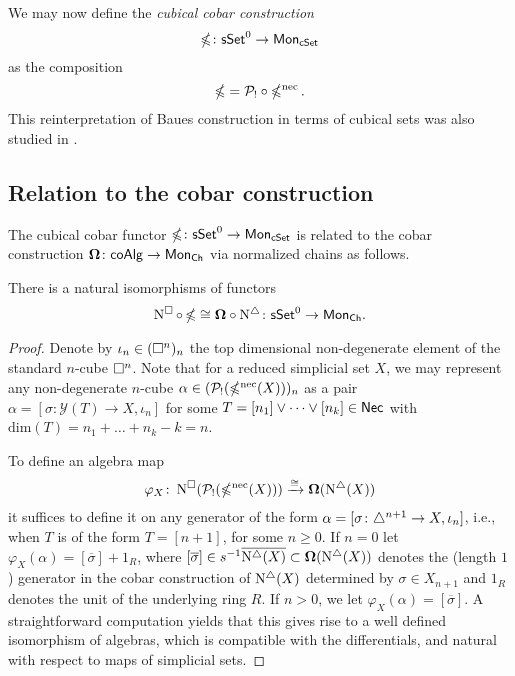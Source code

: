 We may now define the \textit{cubical cobar construction}
$$\operatorname{\mathbb{\Omega}} \colon \mathsf{sSet}^0 \to \mathsf{Mon}_{\mathsf{cSet}}$$ as the composition $$\operatorname{\mathbb{\Omega}}= \mathcal{P}_! \circ \operatorname{\mathbb{\Omega}^{\mathrm{nec}}}.$$ This reinterpretation of Baues construction in terms of cubical sets was also studied in \cite{rivera2018cubical}.

\subsection{Relation to the cobar construction}

The cubical cobar functor $\operatorname{\mathbb{\Omega}}\colon \mathsf{sSet}^0 \to \mathsf{Mon}_{\mathsf{cSet}}$ is related to the cobar construction $\mathbf{\Omega}\colon \mathsf{coAlg} \to \mathsf{Mon}_{\mathsf{Ch}}$ via normalized chains as follows.

\begin{proposition} \label{p:ccobar and cobar}
	There is a natural isomorphisms of functors 
	\begin{equation*}
	\operatorname{N^{\square}} \circ \operatorname{\mathbb{\Omega}} \cong \mathbf{\Omega} \circ \operatorname{N^{\triangle}} \colon \mathsf{sSet}^0 \to \mathsf{Mon}_{\mathsf{Ch}}.
	\end{equation*}
\end{proposition}

\begin{proof} 
	Denote by $\iota_n \in (\square^n)_n$ the top dimensional non-degenerate element of the standard $n$-cube $\square^n$.
	Note that for a reduced simplicial set $X$, we may represent any non-degenerate $n$-cube $\alpha \in (\mathcal{P}_!(\operatorname{\mathbb{\Omega}^{\mathrm{nec}}}(X)))_n$ as a pair $\alpha = [\sigma \colon \mathcal{Y}(T) \to X, \iota_n]$ for some $T = [n_1] \vee \dots \vee [n_k] \in \mathsf{Nec}$ with $\text{dim}(T) = n_1 + \dots + n_k-k = n$.
	
	To define an algebra map
	\begin{equation*}
	\varphi_X \colon \operatorname{N^{\square}}(\mathcal{P}_!(\operatorname{\mathbb{\Omega}^{\mathrm{nec}}}(X))) \xrightarrow{\cong} \mathbf{\Omega}(\operatorname{N^{\triangle}}(X))
	\end{equation*}
	it suffices to define it on any generator of the form $\alpha=[\sigma \colon \triangle^{n+1} \to X, \iota_{n}]$, i.e., when $T$ is of the form $T=[n+1]$, for some $n\geq0$.
	If $n=0$ let $\varphi_X(\alpha)= [\overline{\sigma}]+ 1_R$, where $[\overline{\sigma}] \in s^{-1} \overline{ \operatorname{N^{\triangle}}(X)} \subset \mathbf{\Omega}(\operatorname{N^{\triangle}}(X))$ denotes the (length $1$) generator in the cobar construction of $\operatorname{N^{\triangle}}(X)$ determined by $\sigma \in X_{n+1}$ and $1_R$ denotes the unit of the underlying ring $R$.
	If $n>0$, we let $\varphi_X(\alpha)=[\overline{\sigma}]$.
	A straightforward computation yields that this gives rise to a well defined isomorphism of algebras, which is compatible with the differentials, and natural with respect to maps of simplicial sets.
\end{proof}


